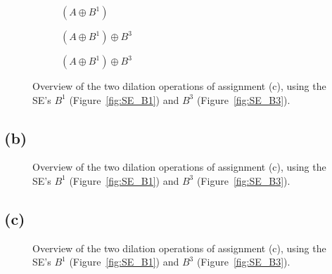 \documentclass{article}
\begin{document}
\begin{figure}[H]
     \centering
     \begin{subfigure}[b]{0.32\textwidth}
         \centering
         
         \caption{$(A \oplus B^1)$}
         \label{fig:wirebondmask_Bcross_dilated}
     \end{subfigure}
     \hfill
     \begin{subfigure}[b]{0.32\textwidth}
         \centering
         
         \caption{$(A \oplus B^1) \oplus B^3$}
         \label{fig:wirebondmask_Bsquare_dilated}
     \end{subfigure}
     \hfill
     \begin{subfigure}[b]{0.32\textwidth}
         \centering
         
         \caption{$(A \oplus B^1) \oplus B^3$}
         \label{fig:wirebondmask_Bbigsquare_dilated}
     \end{subfigure}
     
    \caption{Overview of the two dilation operations of assignment (c), using the SE's $B^1$ (Figure~\ref{fig:SE_B1}) and $B^3$ (Figure~\ref{fig:SE_B3}).}
    \label{fig:wirebondmask_dilated}
\end{figure}

\subsection*{(b)}
\begin{figure}[H]
    \centering
    
    \caption{Overview of the two dilation operations of assignment (c), using the SE's $B^1$ (Figure~\ref{fig:SE_B1}) and $B^3$ (Figure~\ref{fig:SE_B3}).}
    \label{fig:wirebondmask_eroded_all}
\end{figure}
\subsection*{(c)}
\begin{figure}[H]
    \centering
    
    \caption{Overview of the two dilation operations of assignment (c), using the SE's $B^1$ (Figure~\ref{fig:SE_B1}) and $B^3$ (Figure~\ref{fig:SE_B3}).}
    \label{fig:wirebondmask_variousse_eroded_all}
\end{figure}
\end{document}
